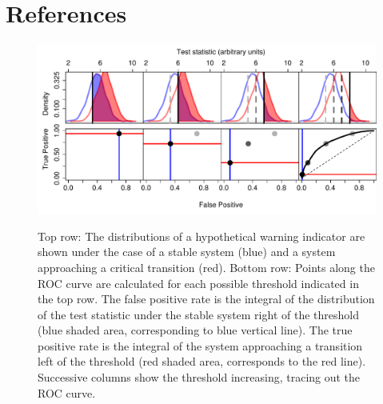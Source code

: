 \documentclass[authoryear,preprint,11pt]{elsarticle}
\begin{document}
 \section{References}%
 



\begin{figure}[hb]
   \begin{center}
     \includegraphics[width=\linewidth]{Fig1}
     \label{fig:fig1}
     \caption{Top row: The distributions of a hypothetical warning indicator are shown under the case of a stable system (blue) and a system approaching a critical transition (red).  Bottom row: Points along the ROC curve are calculated for each possible threshold indicated in the top row.  The false positive rate is the integral of the distribution of the test statistic under the stable system right of the threshold (blue shaded area, corresponding to blue vertical line).  The true positive rate is the integral of the system approaching a transition left of the threshold (red shaded area, corresponds to the red line).  Successive columns show the threshold increasing, tracing out the ROC curve.}
  \end{center}
 \end{figure}
\end{document}
